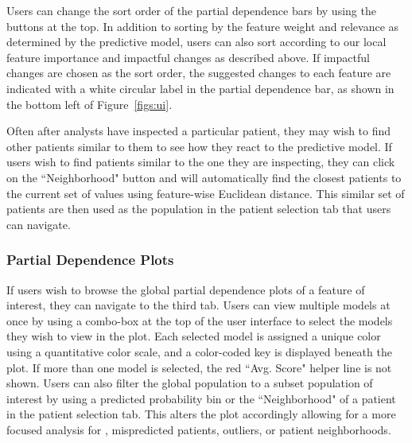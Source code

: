 Users can change the sort order of the partial dependence bars by using the buttons at the top.  In addition to sorting by the feature weight and relevance as determined by the predictive model, users can also sort according to our local feature importance and impactful changes as described above.
If impactful changes are chosen as the sort order, the suggested changes to each feature are indicated with a white circular label in the partial dependence bar, as shown in the bottom left of Figure~\ref{figs:ui}.

Often after analysts have inspected a particular patient, they may wish to find other patients similar to them to see how they react to the predictive model.  If users wish to find patients similar to the one they are inspecting, they can click on the ``Neighborhood" button and \prospector will automatically find the closest patients to the current set of values using feature-wise Euclidean distance.  This similar set of patients are then used as the population in the patient selection tab that users can navigate.

\subsubsection{Partial Dependence Plots}

If users wish to browse the global partial dependence plots of a feature of interest, they can navigate to the third tab.  Users can view multiple models at once by using a combo-box at the top of the user interface to select the models they wish to view in the plot.  Each selected model is assigned a unique color using a quantitative color scale, and a color-coded key is displayed beneath the plot.  If more than one model is selected, the red ``Avg. Score" helper line is not shown.  Users can also filter the global population to a subset population of interest by using a  predicted probability bin or the ``Neighborhood" of a patient in the patient selection tab. This alters the plot accordingly allowing for a more focused analysis for \eg, mispredicted patients, outliers, or patient neighborhoods.






